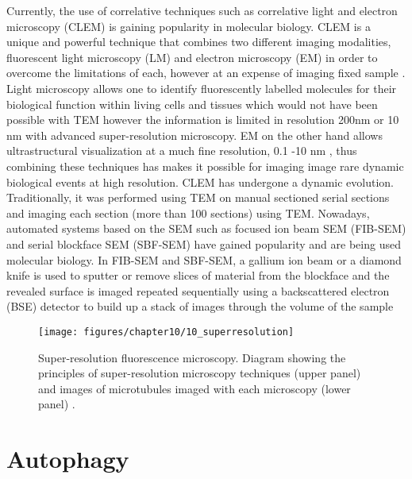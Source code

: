 Currently, the use of correlative techniques such as correlative light and electron microscopy (CLEM) is gaining popularity in molecular biology. CLEM is a unique and powerful technique that combines two different imaging modalities, fluorescent light microscopy (LM) and electron microscopy (EM) in order to overcome the limitations of each, however at an expense of imaging fixed sample \citep{Russell2017}. Light microscopy allows one to identify fluorescently labelled molecules for their biological function within living cells and tissues which would not have been possible with TEM however the information is limited in resolution 200nm or 10 nm with advanced super-resolution microscopy.  EM on the other hand allows ultrastructural visualization at a much fine resolution, 0.1 -10 nm \citep{Feng2018}, thus combining these techniques has makes it possible for imaging image  rare dynamic biological events at high resolution. CLEM has undergone a dynamic evolution. Traditionally, it was performed using TEM on manual sectioned serial sections and imaging each section (more than 100 sections) using TEM. Nowadays, automated systems  based on the SEM such as focused ion beam SEM (FIB-SEM) \citep{Heymann2006} and serial blockface SEM (SBF-SEM) \citep{Denk2004} have gained popularity and are being used molecular biology. In FIB-SEM and SBF-SEM, a gallium ion beam  or a diamond knife is used to sputter or remove slices of material from the blockface and the revealed surface is imaged repeated sequentially using a backscattered electron (BSE) detector to build up a stack of images through the volume of the sample \citep{Russell2017}

\begin{figure}[!htbp]
  \texttt{[image: figures/chapter10/10\_superresolution]}
  \caption[Super-resolution fluorescence microscopy.]{Super-resolution fluorescence microscopy. Diagram showing the principles of super-resolution microscopy techniques (upper panel) and images  of microtubules imaged with each microscopy (lower panel) \citep{Feng2018}.}
  \label{fig:10_superresolution}
\end{figure}

\section{Autophagy}

